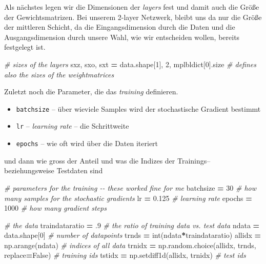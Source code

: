 \documentclass[
]{book}
\newenvironment{Shaded}{\begin{snugshade}}{\end{snugshade}}
\newcommand{\BuiltInTok}[1]{#1}
\newcommand{\CommentTok}[1]{\textcolor[rgb]{0.56,0.35,0.01}{\textit{#1}}}
\newcommand{\DecValTok}[1]{\textcolor[rgb]{0.00,0.00,0.81}{#1}}
\newcommand{\FloatTok}[1]{\textcolor[rgb]{0.00,0.00,0.81}{#1}}
\newcommand{\NormalTok}[1]{#1}
\newcommand{\OperatorTok}[1]{\textcolor[rgb]{0.81,0.36,0.00}{\textbf{#1}}}
\newcommand{\VariableTok}[1]{\textcolor[rgb]{0.00,0.00,0.00}{#1}}
\providecommand{\tightlist}{%
  \setlength{\itemsep}{0pt}\setlength{\parskip}{0pt}}
\theoremstyle{definition}
\theoremstyle{definition}
\theoremstyle{definition}
\theoremstyle{definition}
\theoremstyle{remark}
\begin{document}
Als nächstes legen wir die Dimensionen der \emph{layers} fest und damit auch die
Größe der Gewichtsmatrizen. Bei unserem 2-layer Netzwerk, bleibt uns
da nur die Größe der mittleren Schicht, da die Eingangsdimension
durch die Daten und die Ausgangsdimension durch unsere Wahl, wie wir entscheiden
wollen, bereits festgelegt ist.

\begin{Shaded}
\begin{Highlighting}[]
\CommentTok{\# sizes of the layers}
\NormalTok{sxz, sxo, sxt }\OperatorTok{=}\NormalTok{ data.shape[}\DecValTok{1}\NormalTok{], }\DecValTok{2}\NormalTok{, mplbldict[}\DecValTok{0}\NormalTok{].size}
\CommentTok{\# defines also the sizes of the weightmatrices}
\end{Highlighting}
\end{Shaded}

Zuletzt noch die Parameter, die das \emph{training} definieren.

\begin{itemize}
\tightlist
\item
  \texttt{batchsize} -- über wieviele Samples wird der stochastische Gradient
  bestimmt
\item
  \texttt{lr} -- \emph{learning rate} -- die Schrittweite
\item
  \texttt{epochs} -- wie oft wird über die Daten iteriert
\end{itemize}

und dann wie gross der Anteil und was die Indizes der Trainings--
beziehungsweise Testdaten sind

\begin{Shaded}
\begin{Highlighting}[]
\CommentTok{\# parameters for the training {-}{-} these worked fine for me}
\NormalTok{batchsize }\OperatorTok{=} \DecValTok{30}  \CommentTok{\# how many samples for the stochastic gradients}
\NormalTok{lr }\OperatorTok{=} \FloatTok{0.125}  \CommentTok{\# learning rate}
\NormalTok{epochs }\OperatorTok{=} \DecValTok{1000}  \CommentTok{\# how many gradient steps}

\CommentTok{\# the data}
\NormalTok{traindataratio }\OperatorTok{=} \FloatTok{.9}     \CommentTok{\# the ratio of training data vs. test data}
\NormalTok{ndata }\OperatorTok{=}\NormalTok{ data.shape[}\DecValTok{0}\NormalTok{]   }\CommentTok{\# number of datapoints                                       }
\NormalTok{trnds }\OperatorTok{=} \BuiltInTok{int}\NormalTok{(ndata}\OperatorTok{*}\NormalTok{traindataratio)}
\NormalTok{allidx }\OperatorTok{=}\NormalTok{ np.arange(ndata)                                   }\CommentTok{\# indices of all data}
\NormalTok{trnidx }\OperatorTok{=}\NormalTok{ np.random.choice(allidx, trnds, replace}\OperatorTok{=}\VariableTok{False}\NormalTok{)     }\CommentTok{\# training ids}
\NormalTok{tstidx }\OperatorTok{=}\NormalTok{ np.setdiff1d(allidx, trnidx)                       }\CommentTok{\# test ids}
\end{Highlighting}
\end{Shaded}
\end{document}
